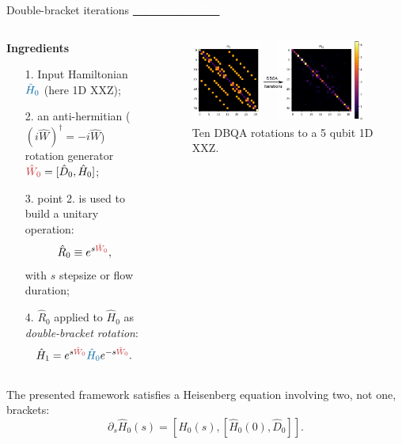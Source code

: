 \documentclass[aspectratio=169, 8pt, xcolor={svgnames}]{beamer}
\begin{document}
\begin{frame}{Double-bracket iterations \hfill \href{https://arxiv.org/abs/2206.11772}{\textcolor{white}{\faBook\,\,arXiv:2206.11772}}}
\begin{columns}[T,onlytextwidth]
    \begin{column}{0.45\textwidth}
    \textbf{Ingredients}
        \begin{itemize}[noitemsep]
            \item[1.] Input Hamiltonian $\textcolor{mediumpersianblue}{\hat H_0}$ (here 1D XXZ);
            \item[2.] an anti-hermitian ($(i\hat{W})^{\dagger} = -i\hat{W}$) rotation generator $\textcolor{persianred}{\hat{W}_0} = [\hat{D}_0, \hat H_0]$;
            \item[3.] point 2. is used to build a unitary operation:
              $$ \hat{R}_0 \equiv e^{s \textcolor{persianred}{\hat{W}_0}}, $$
              with $s$ stepsize or flow duration;
            \item[4.] $\hat{R}_0$ applied to $\hat{H}_0$ as \textit{double-bracket rotation}:
               $$ \hat H_1 =  e^{s\textcolor{persianred}{\hat{W}_0}} \textcolor{mediumpersianblue}{\hat H_0} e^{- s \textcolor{persianred}{\hat{W}_0}}.$$
        \end{itemize}

    \end{column}

    \begin{column}{0.55\textwidth}
        \begin{figure}
           \includegraphics[width=0.95\textwidth]{figures/dbqa_10steps.pdf}
        \caption{Ten DBQA rotations to a 5 qubit 1D XXZ.}
        \end{figure}
    \end{column}
\end{columns}
\begin{tcolorbox}[colback=red!15, title=Nomenclature reason]
The presented framework satisfies a Heisenberg equation involving two, not one, brackets:
$$ \partial_s \hat{H}_0(s) = [ \hat{H}_0(s), [ \hat{H}_0(0), \hat{D}_0 ] ]. $$
\end{tcolorbox}
\end{frame}
\end{document}
